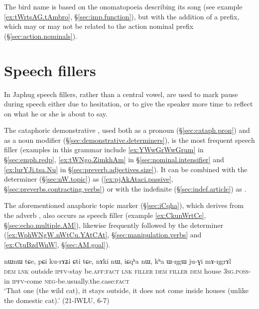 The bird name  is based on the onomatopoeia describing its song (see example \ref{ex:tWrtsAG.tAmbro}, §\ref{sec:imp.function}), but with the addition of a  prefix, which may or may not be related to the action nominal  prefix (§\ref{sec:action.nominals}).

\section{Speech fillers} \label{sec:fillers}
In Japhug speech fillers, rather than a central vowel, are used to mark pause during speech either due to hesitation, or to give the speaker more time to reflect on what he or she is about to say.

The cataphoric demonstrative , used both as a pronoun (§\ref{sec:cataph.pron}) and as a noun modifier (§\ref{sec:demonstrative.determiners}), is the most frequent speech filler (examples in this grammar include \ref{ex:YWwGrWwGrum} in §\ref{sec:emph.redp}, \ref{ex:tWNgo.ZimkhAm} in §\ref{sec:nominal.intensifier} and \ref{ex:lurYJi.tsa.Nu} in §\ref{sec:preverb.adjectives.size}). It can be combined with the determiner  (§\ref{sec:nW.topic}) as  (\ref{ex:pjAkAtaci.passive}, §\ref{sec:preverbs.contracting.verbs}) or with the indefinite  (§\ref{sec:indef.article}) as . 
  
The aforementioned anaphoric topic marker  (§\ref{sec:iCqha}), which derives from the adverb , also occurs as speech filler (example \ref{ex:CkunWrtCe}, §\ref{sec:echo.multiple.AM}), likewise frequently followed by the determiner  (\ref{ex:WphWNgW.nWtCu.YAtCAt}, §\ref{sec:manipulation.verbs} and \ref{ex:CtuBzdWnW}, §\ref{sec:AM.goal}).


\begin{exe}
\ex \label{ex:nAkinW.iCqhanW}
\gll nɯnɯ tɕe, pɕi ku-rɤʑi ɕti tɕe, nɤki nɯ, iɕqʰa nɯ, kʰa ɯ-ŋgɯ ju-ɣi mɤ-ŋgrɤl \\
\textsc{dem} \textsc{lnk} outside \textsc{ipfv}-stay be.\textsc{aff}:\textsc{fact} \textsc{lnk} \textsc{filler} \textsc{dem} \textsc{filler} \textsc{dem} house \textsc{3sg}.\textsc{poss}-in \textsc{ipfv}-come \textsc{neg}-be.usually.the.case:\textsc{fact} \\
\glt `That one (the wild cat), it stays outside, it does not come inside houses (unlike the domestic cat).' (21-lWLU, 6-7)
\end{exe}

